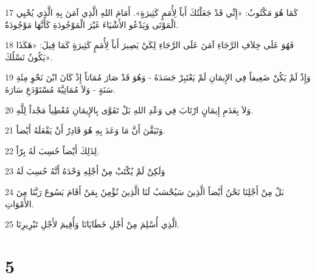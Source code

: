 \par 17 كَمَا هُوَ مَكْتُوبٌ: «إِنِّي قَدْ جَعَلْتُكَ أَباً لِأُمَمٍ كَثِيرَةٍ». أَمَامَ اللهِ الَّذِي آمَنَ بِهِ الَّذِي يُحْيِي الْمَوْتَى وَيَدْعُو الأَشْيَاءَ غَيْرَ الْمَوْجُودَةِ كَأَنَّهَا مَوْجُودَةٌ.
\par 18 فَهُوَ عَلَى خِلاَفِ الرَّجَاءِ آمَنَ عَلَى الرَّجَاءِ لِكَيْ يَصِيرَ أَباً لِأُمَمٍ كَثِيرَةٍ كَمَا قِيلَ: «هَكَذَا يَكُونُ نَسْلُكَ».
\par 19 وَإِذْ لَمْ يَكُنْ ضَعِيفاً فِي الإِيمَانِ لَمْ يَعْتَبِرْ جَسَدَهُ - وَهُوَ قَدْ صَارَ مُمَاتاً إِذْ كَانَ ابْنَ نَحْوِ مِئَةِ سَنَةٍ - وَلاَ مُمَاتِيَّةَ مُسْتَوْدَعِ سَارَةَ.
\par 20 وَلاَ بِعَدَمِ إِيمَانٍ ارْتَابَ فِي وَعْدِ اللهِ بَلْ تَقَوَّى بِالإِيمَانِ مُعْطِياً مَجْداً لِلَّهِ.
\par 21 وَتَيَقَّنَ أَنَّ مَا وَعَدَ بِهِ هُوَ قَادِرٌ أَنْ يَفْعَلَهُ أَيْضاً.
\par 22 لِذَلِكَ أَيْضاً حُسِبَ لَهُ بِرّاً.
\par 23 وَلَكِنْ لَمْ يُكْتَبْ مِنْ أَجْلِهِ وَحْدَهُ أَنَّهُ حُسِبَ لَهُ
\par 24 بَلْ مِنْ أَجْلِنَا نَحْنُ أَيْضاً الَّذِينَ سَيُحْسَبُ لَنَا الَّذِينَ نُؤْمِنُ بِمَنْ أَقَامَ يَسُوعَ رَبَّنَا مِنَ الأَمْوَاتِ.
\par 25 الَّذِي أُسْلِمَ مِنْ أَجْلِ خَطَايَانَا وَأُقِيمَ لأَجْلِ تَبْرِيرِنَا.

\chapter{5}

